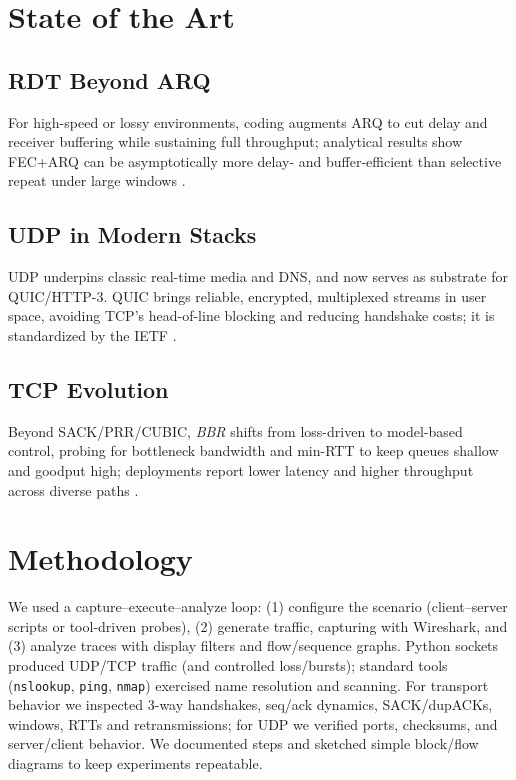 
\section{State of the Art}

\subsection{RDT Beyond ARQ}
For high-speed or lossy environments, coding augments ARQ to cut delay and receiver buffering while sustaining full throughput; analytical results show FEC+ARQ can be asymptotically more delay- and buffer-efficient than selective repeat under large windows \cite{ghaderi2013scalablerdt}.

\subsection{UDP in Modern Stacks}
UDP underpins classic real-time media and DNS, and now serves as substrate for QUIC/HTTP-3. QUIC brings reliable, encrypted, multiplexed streams in user space, avoiding TCP’s head-of-line blocking and reducing handshake costs; it is standardized by the IETF \cite{rfc9000}.

\subsection{TCP Evolution}
Beyond SACK/PRR/CUBIC, \textit{BBR} shifts from loss-driven to model-based control, probing for bottleneck bandwidth and min-RTT to keep queues shallow and goodput high; deployments report lower latency and higher throughput across diverse paths \cite{cardwell2017bbr}.



\section{Methodology}
We used a capture–execute–analyze loop: (1) configure the scenario (client–server scripts or tool-driven probes), (2) generate traffic, capturing with Wireshark, and (3) analyze traces with display filters and flow/sequence graphs. Python sockets produced UDP/TCP traffic (and controlled loss/bursts); standard tools (\texttt{nslookup}, \texttt{ping}, \texttt{nmap}) exercised name resolution and scanning. For transport behavior we inspected 3-way handshakes, seq/ack dynamics, SACK/dupACKs, windows, RTTs and retransmissions; for UDP we verified ports, checksums, and server/client behavior. We documented steps and sketched simple block/flow diagrams to keep experiments repeatable.

